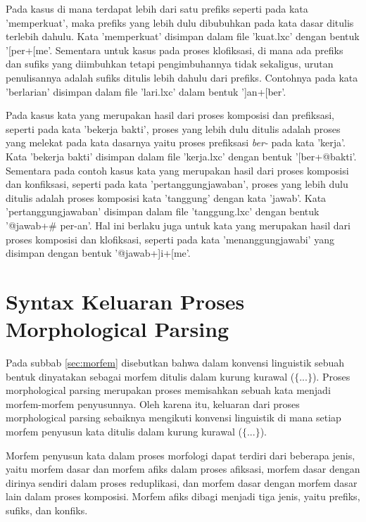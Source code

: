 Pada kasus di mana terdapat lebih dari satu prefiks seperti pada kata 'memperkuat', maka prefiks yang lebih dulu dibubuhkan pada kata dasar ditulis terlebih dahulu. Kata 'memperkuat' disimpan dalam file 'kuat.lxc' dengan bentuk '[per+[me'. Sementara untuk kasus pada proses klofiksasi, di mana ada prefiks dan sufiks yang diimbuhkan tetapi pengimbuhannya tidak sekaligus, urutan penulisannya adalah sufiks ditulis lebih dahulu dari prefiks. Contohnya pada kata 'berlarian' disimpan dalam file 'lari.lxc' dalam bentuk ']an+[ber'.

Pada kasus kata yang merupakan hasil dari proses komposisi dan prefiksasi, seperti pada kata 'bekerja bakti', proses yang lebih dulu ditulis adalah proses yang melekat pada kata dasarnya yaitu proses prefiksasi \textit{ber-} pada kata 'kerja'. Kata 'bekerja bakti' disimpan dalam file 'kerja.lxc' dengan bentuk '[ber+@bakti'. Sementara pada contoh kasus kata yang merupakan hasil dari proses komposisi dan konfiksasi, seperti pada kata 'pertanggungjawaban', proses yang lebih dulu ditulis adalah proses komposisi kata 'tanggung' dengan kata 'jawab'. Kata 'pertanggungjawaban' disimpan dalam file 'tanggung.lxc' dengan bentuk '@jawab+\# per-an'. Hal ini berlaku juga untuk kata yang merupakan hasil dari proses komposisi dan klofiksasi, seperti pada kata 'menanggungjawabi' yang disimpan dengan bentuk '@jawab+]i+[me'.


\section{Syntax Keluaran Proses Morphological Parsing}
\label{sec:syntaxKeluaran}

Pada subbab \ref{sec:morfem} disebutkan bahwa dalam konvensi linguistik sebuah bentuk dinyatakan sebagai morfem ditulis dalam kurung kurawal ($\lbrace$...$\rbrace$). Proses morphological parsing merupakan proses memisahkan sebuah kata menjadi morfem-morfem penyusunnya. Oleh karena itu, keluaran dari proses morphological parsing sebaiknya mengikuti konvensi linguistik di mana setiap morfem penyusun kata ditulis dalam kurung kurawal ($\lbrace$...$\rbrace$).

Morfem penyusun kata dalam proses morfologi dapat terdiri dari beberapa jenis, yaitu morfem dasar dan morfem afiks dalam proses afiksasi, morfem dasar dengan dirinya sendiri dalam proses reduplikasi, dan morfem dasar dengan morfem dasar lain dalam proses komposisi. Morfem afiks dibagi menjadi tiga jenis, yaitu prefiks, sufiks, dan konfiks. 

